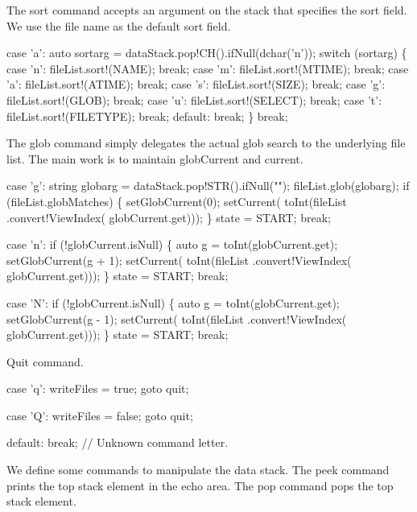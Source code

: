 \nwendcode{}The sort command accepts an argument on the stack that specifies the
sort field. We use the file name as the default sort field.

\nwenddocs{}\plusendmoddef\nwstartdeflinemarkup\nwenddeflinemarkup
case 'a':
  auto sortarg = dataStack.pop!CH().ifNull(dchar('n'));
  switch (sortarg) \{
    case 'n': fileList.sort!(NAME);     break;
    case 'm': fileList.sort!(MTIME);    break;
    case 'a': fileList.sort!(ATIME);    break;
    case 's': fileList.sort!(SIZE);     break;
    case 'g': fileList.sort!(GLOB);     break;
    case 'u': fileList.sort!(SELECT);   break;
    case 't': fileList.sort!(FILETYPE); break;
    default:  break;
  \}
  break;

\nwendcode{}The glob command simply delegates the actual glob search to the
underlying file list. The main work is to maintain {\Tt{}globCurrent\nwendquote} and
{\Tt{}current\nwendquote}.

\nwenddocs{}\plusendmoddef\nwstartdeflinemarkup\nwenddeflinemarkup
case 'g':
  string globarg = dataStack.pop!STR().ifNull("");
  fileList.glob(globarg);
  if (fileList.globMatches) \{
    setGlobCurrent(0);
    setCurrent(
      toInt(fileList
            .convert!ViewIndex(
              globCurrent.get)));
  \}
  state = START;
  break;

case 'n':
  if (!globCurrent.isNull) \{
    auto g = toInt(globCurrent.get);
    setGlobCurrent(g + 1);
    setCurrent(
      toInt(fileList
            .convert!ViewIndex(
              globCurrent.get)));
  \}
  state = START;
  break;

case 'N':
  if (!globCurrent.isNull) \{
    auto g = toInt(globCurrent.get);
    setGlobCurrent(g - 1);
    setCurrent(
      toInt(fileList
            .convert!ViewIndex(
              globCurrent.get)));
  \}
  state = START;
  break;

\nwendcode{}Quit command.

\nwenddocs{}\plusendmoddef\nwstartdeflinemarkup\nwenddeflinemarkup
case 'q':
  writeFiles = true;
  goto quit;

case 'Q':
  writeFiles = false;
  goto quit;

\nwendcode{}\plusendmoddef\nwstartdeflinemarkup\nwenddeflinemarkup
default: break; // Unknown command letter.

\nwendcode{}We define some commands to manipulate the data stack. The peek
command prints the top stack element in the echo area. The pop command
pops the top stack element.

